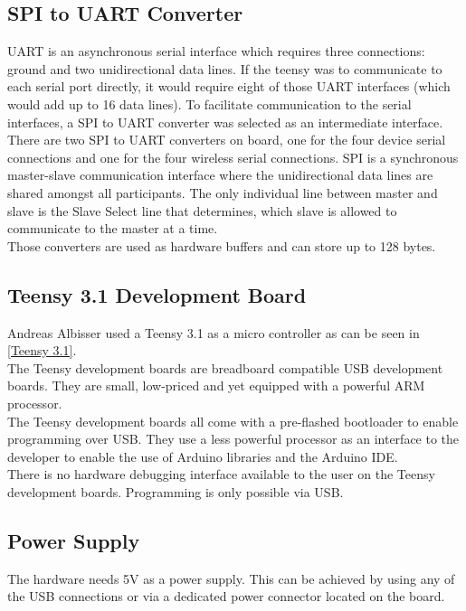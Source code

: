 \subsection{SPI to UART Converter}
UART is an asynchronous serial interface which requires three connections: ground and two unidirectional data lines. If the teensy was to communicate to each serial port directly, it would require eight of those UART interfaces (which would add up to 16 data lines). To facilitate communication to the serial interfaces, a SPI to UART converter was selected as an intermediate interface.\\
There are two SPI to UART converters on board, one for the four device serial connections and one for the four wireless serial connections. SPI is a synchronous master-slave communication interface where the unidirectional data lines are shared amongst all participants. The only individual line between master and slave is the Slave Select line that determines, which slave is allowed to communicate to the master at a time. \\
Those converters are used as hardware buffers and can store up to 128 bytes.\\
%
\subsection{Teensy 3.1 Development Board}
Andreas Albisser used a Teensy 3.1 as a micro controller as can be seen in \autoref{Teensy 3.1}.\\
The Teensy development boards are breadboard compatible USB development boards. They are small, low-priced and yet equipped with a powerful ARM processor.\\
The Teensy development boards all come with a pre-flashed bootloader to enable programming over USB. They use a less powerful processor as an interface to the developer to enable the use of Arduino libraries and the Arduino IDE.\\
There is no hardware debugging interface available to the user on the Teensy development boards. Programming is only possible via USB.\\
%
%
\subsection{Power Supply}
The hardware needs 5V as a power supply. This can be achieved by using any of the USB connections or via a dedicated power connector located on the board. \\
%
%
%
%
%
%
%
